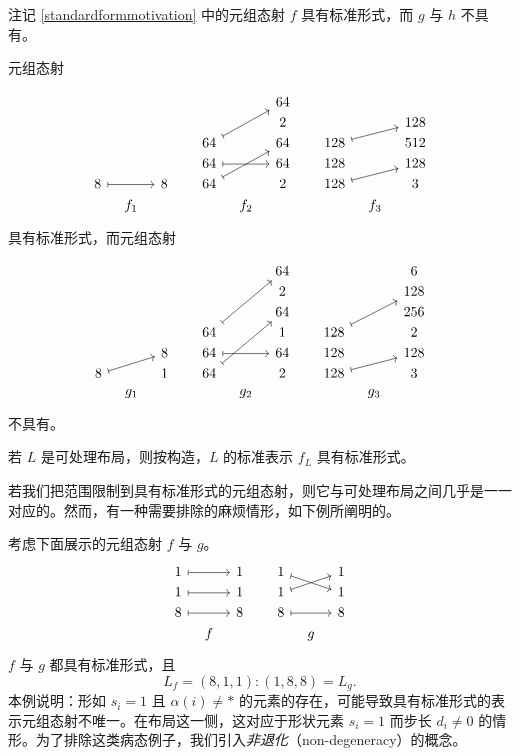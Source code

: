 \begin{example}
    注记 \ref{standardformmotivation} 中的元组态射 $f$ 具有标准形式，而 $g$ 与 $h$ 不具有。
\end{example}

\begin{example}
    元组态射

    \[ \begin{tikzcd} [row sep = 1, column sep = 8]
 & & & & & & 64 & &  & &  \\
 & &  & & & & 2 & & & & 128\\
& &  & & 64 \ar[rruu,mapsto] & & 64 & &  128 \ar[urr,mapsto] & & 512\\
& &  & & 64 \ar[rr,mapsto] & & 64 & & 128  & & 128\\
8 \ar[rr,mapsto] & & 8 & & 64 \ar[rruu,mapsto] & & 2 & & 128 \ar[rru,mapsto]  & & 3\\
& f_1 & & & & f_2 & & & & f_3 & \\
\end{tikzcd} \]
    具有标准形式，而元组态射

    \[ \begin{tikzcd} [row sep = 1, column sep = 8]
 & & & & & & 64 & & & & 6\\
 & & & & & & 2 & &  & & 128\\
 & &  & & & & 64 & & & & 256\\
& &  & & 64 \ar[rruuu,mapsto] & & 1 & &  128 \ar[uurr,mapsto] & & 2\\
& & 8 & & 64 \ar[rr,mapsto] & & 64 & & 128  & & 128\\
8 \ar[rru,mapsto] & & 1 & & 64 \ar[rruuu,mapsto] & & 2 & & 128 \ar[rru,mapsto]  & & 3\\
& g_1 & & & & g_2 & & & & g_3 & \\
\end{tikzcd} \]
    不具有。
\end{example}

\begin{example}
    若 $L$ 是可处理布局，则按构造，$L$ 的标准表示 $f_L$ 具有标准形式。
\end{example}

若我们把范围限制到具有标准形式的元组态射，则它与可处理布局之间几乎是一一对应的。然而，有一种需要排除的麻烦情形，如下例所阐明的。

\begin{example}\label{badlayouts}
考虑下面展示的元组态射 $f$ 与 $g$。
\[ \begin{tikzcd}[row sep = 1, column sep = 8]
1 \ar[rr,mapsto] & & 1 & & 1\ar[drr,mapsto]  & & 1\\
1 \ar[rr,mapsto] & & 1 & & 1\ar[urr,mapsto]  & & 1\\
8 \ar[rr,mapsto] & & 8 & & 8 \ar[rr,mapsto] & & 8\\
 & f & & & & g &
\end{tikzcd}\]
$f$ 与 $g$ 都具有标准形式，且
\[
L_f = (8,1,1):(1,8,8) = L_g.
\]
本例说明：形如 $s_i = 1$ 且 $\alpha(i) \neq *$ 的元素的存在，可能导致具有标准形式的表示元组态射不唯一。在布局这一侧，这对应于形状元素 $s_i = 1$ 而步长 $d_i \neq 0$ 的情形。为了排除这类病态例子，我们引入{\it 非退化}（non-degeneracy）的概念。
\end{example}



